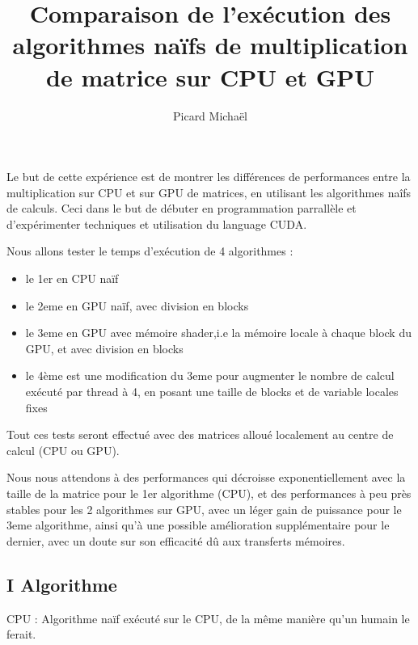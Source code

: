 \documentclass[]{article}
\title{Comparaison de l'exécution des algorithmes naïfs de multiplication de
matrice sur CPU et GPU}
\author{Picard Michaël}
\date{}
\providecommand{\tightlist}{%
  \setlength{\itemsep}{0pt}\setlength{\parskip}{0pt}}
\begin{document}
\maketitle

Le but de cette expérience est de montrer les différences de
performances entre la multiplication sur CPU et sur GPU de matrices, en
utilisant les algorithmes naîfs de calculs. Ceci dans le but de débuter
en programmation parrallèle et d'expérimenter techniques et utilisation
du language CUDA.

Nous allons tester le temps d'exécution de 4 algorithmes :

\begin{itemize}
\tightlist
\item
  le 1er en CPU naïf
\item
  le 2eme en GPU naïf, avec division en blocks
\item
  le 3eme en GPU avec mémoire shader,i.e la mémoire locale à chaque
  block du GPU, et avec division en blocks
\item
  le 4ème est une modification du 3eme pour augmenter le nombre de
  calcul exécuté par thread à 4, en posant une taille de blocks et de
  variable locales fixes
\end{itemize}

Tout ces tests seront effectué avec des matrices alloué localement au
centre de calcul (CPU ou GPU).

Nous nous attendons à des performances qui décroisse exponentiellement
avec la taille de la matrice pour le 1er algorithme (CPU), et des
performances à peu près stables pour les 2 algorithmes sur GPU, avec un
léger gain de puissance pour le 3eme algorithme, ainsi qu'à une possible
amélioration supplémentaire pour le dernier, avec un doute sur son
efficacité dû aux transferts mémoires.

\subsection{I Algorithme}\label{i-algorithme}

CPU : Algorithme naïf exécuté sur le CPU, de la même manière qu'un
humain le ferait.
\end{document}
